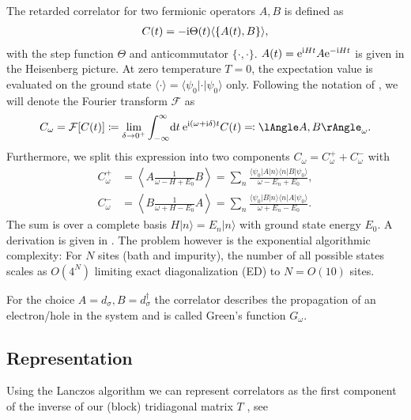 The retarded correlator for two fermionic operators $A, B$ is defined as
\begin{align}
    C(t) = -\mathrm{i} \Theta(t) \langle\{A(t), B\}\rangle,
\end{align}
with the step function $\Theta$ and anticommutator $\{\cdot,\cdot\}$.
$A(t) = \mathrm{e}^{\mathrm{i} H t} A \mathrm{e}^{-\mathrm{i} H t}$ is given in the Heisenberg picture.
At zero temperature $T=0$, the expectation value is evaluated on the ground state
$\langle\cdot\rangle = \langle\psi_0 | \cdot | \psi_0\rangle$ only.
Following the notation of \cite{Bulla1998,Kugler2022},
we will denote the Fourier transform $\mathcal{F}$ as
\begin{equation}
    C_\omega
    =
    \mathcal{F}[C(t)]
    \coloneq
    \lim_{\delta\to0^+}
    \int_{-\infty}^\infty\! \md t\> \me^{\mi (\omega + \mi\delta) t} C(t)
    \eqcolon
    \lAngle A, B\rAngle_\omega.
\end{equation}
Furthermore,
we split this expression into two components $C_\omega = C^+_\omega + C^-_\omega$ with
\begin{subequations}
    \begin{align}
        C^+_\omega
         & =
        \left\langle A \frac{1}{\omega - H + E_0} B\right\rangle
        =
        \sum_n \frac{\langle\psi_0 | A | n\rangle\langle n | B | \psi_0\rangle}{\omega - E_n + E_0}, \\
        C^-_\omega
         & =
        \left\langle B \frac{1}{\omega + H - E_0} A\right\rangle
        =
        \sum_n \frac{\langle\psi_0 | B | n\rangle\langle n | A | \psi_0\rangle}{\omega + E_n - E_0}.
    \end{align}
\end{subequations}
The sum is over a complete basis $H|n\rangle = E_n|n\rangle$ with ground state energy $E_0$.
A derivation is given in .
The problem however is the exponential algorithmic complexity:
For $N$ sites (bath and impurity), the number of all possible states scales as $O(4^N)$
limiting exact diagonalization (ED) to $N=O(10)$ sites.

For the choice $A=d_\sigma, B=d_\sigma^\dag$ the correlator describes
the propagation of an electron/hole in the system and is called Green's function $G_\omega$.

\subsection{Representation}

Using the Lanczos algorithm we can represent correlators as the first component of the inverse
of our (block) tridiagonal matrix $T$ \cite{Lu2014}, see 

